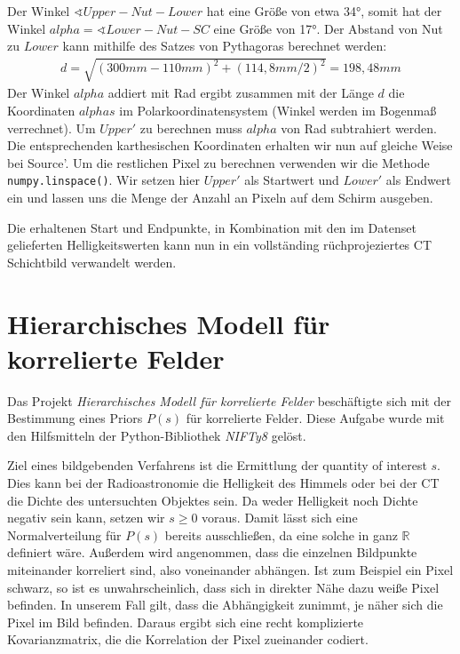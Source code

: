 \documentclass[]{dsadokumentation}
\begin{document}
Der Winkel $\sphericalangle Upper-Nut-Lower$ hat eine Größe von etwa 34°, somit hat der Winkel $alpha = \sphericalangle Lower-Nut-SC$ eine Größe von 17°. Der Abstand von Nut zu $Lower$ kann mithilfe des Satzes von Pythagoras berechnet werden:
\begin{align}
d = \sqrt{(300mm - 110mm)^2+(114,8mm/2)^2} = 198,48mm
\end{align}
Der Winkel $alpha$ addiert mit Rad ergibt zusammen mit der Länge $d$ die Koordinaten $alphas$ im Polarkoordinatensystem (Winkel werden im Bogenmaß verrechnet). Um $Upper'$ zu berechnen muss $alpha$ von Rad subtrahiert werden. Die entsprechenden karthesischen Koordinaten erhalten wir nun auf gleiche Weise bei Source'. Um die restlichen Pixel zu berechnen verwenden wir die Methode \verb+numpy.linspace()+. Wir setzen hier $Upper'$ als Startwert und $Lower'$ als Endwert ein und lassen uns die Menge der Anzahl an Pixeln auf dem Schirm ausgeben. 

Die erhaltenen Start und Endpunkte, in Kombination mit den im Datenset gelieferten Helligkeitswerten kann nun in ein vollständing rüchprojeziertes CT Schichtbild verwandelt werden.


\section{Hierarchisches Modell für korrelierte Felder}
Das Projekt \emph{Hierarchisches Modell für korrelierte Felder} beschäftigte sich mit der Bestimmung eines Priors $P(s)$ für korrelierte Felder. Diese Aufgabe wurde mit den Hilfsmitteln der Python-Bibliothek \emph{NIFTy8} gelöst.

Ziel eines bildgebenden Verfahrens ist die Ermittlung der quantity of interest $s$. Dies kann bei der Radioastronomie die Helligkeit des Himmels oder bei der CT die Dichte des untersuchten Objektes sein. Da weder Helligkeit noch Dichte negativ sein kann, setzen wir $s \geq 0$ voraus. Damit lässt sich eine Normalverteilung für $P(s)$ bereits ausschließen, da eine solche in ganz $\mathbb{R}$ definiert wäre. Außerdem wird angenommen, dass die einzelnen Bildpunkte miteinander korreliert sind, also voneinander abhängen. Ist zum Beispiel ein Pixel schwarz, so ist es unwahrscheinlich, dass sich in direkter Nähe dazu weiße Pixel befinden. In unserem Fall gilt, dass die Abhängigkeit zunimmt, je näher sich die Pixel im Bild befinden. Daraus ergibt sich eine recht komplizierte Kovarianzmatrix, die die Korrelation der Pixel zueinander codiert.
\end{document}
